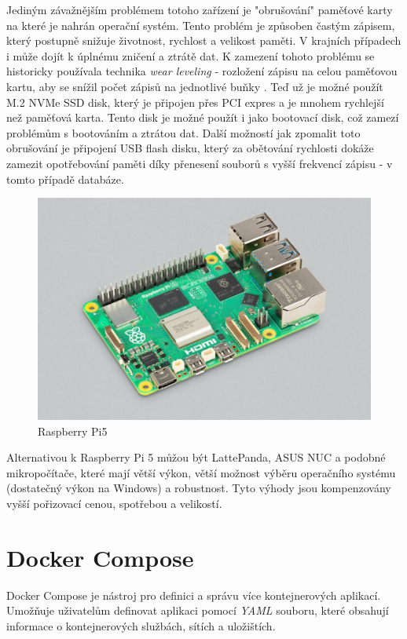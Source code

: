 Jediným závažnějším problémem totoho zařízení je "obrušování" paměťové karty na které je nahrán operační systém. Tento problém je způsoben častým zápisem, který postupně snižuje životnost, rychlost a velikost paměti. V krajních případech i může dojít k úplnému zničení a ztrátě dat. K zamezení tohoto problému se historicky používala technika \textit{wear leveling} - rozložení zápisu na celou paměťovou kartu, aby se snížil počet zápisů na jednotlivé buňky \cite{wear leveling}. Teď už je možné použít M.2 NVMe SSD disk, který je připojen přes PCI expres a je mnohem rychlejší než paměťová karta. Tento disk je možné použít i jako bootovací disk, což zamezí problémům s bootováním a ztrátou dat. Další možností jak zpomalit toto obrušování je připojení USB flash disku, který za obětování rychlosti dokáže zamezit opotřebování paměti díky přenesení souborů s vyšší frekvencí zápisu - v tomto případě databáze.
\begin{figure}[!ht]
    \begin{center}
        \includegraphics[scale=0.30]{obrazky/RaspberryPi5.jpg}
    \end{center}
    \caption[Raspberry Pi5 \cite{Raspberry Pi 5}]{Raspberry Pi5 \cite{Raspberry Pi 5}}
    \label{fig:RaspberryPi}
\end{figure}
\newpage
Alternativou k Raspberry Pi 5 můžou být LattePanda, ASUS NUC a podobné mikropočítače, které mají větší výkon, větší možnost výběru operačního systému (dostatečný výkon na Windows) a robustnost. Tyto výhody jsou kompenzovány vyšší pořizovací cenou, spotřebou a velikostí.
\section{Docker Compose}
Docker Compose je nástroj pro definici a správu více kontejnerových aplikací. Umožňuje uživatelům definovat aplikaci pomocí \textit{YAML} souboru, které obsahují informace o kontejnerových službách, sítích a uložištích. \cite{Docker Compose}

